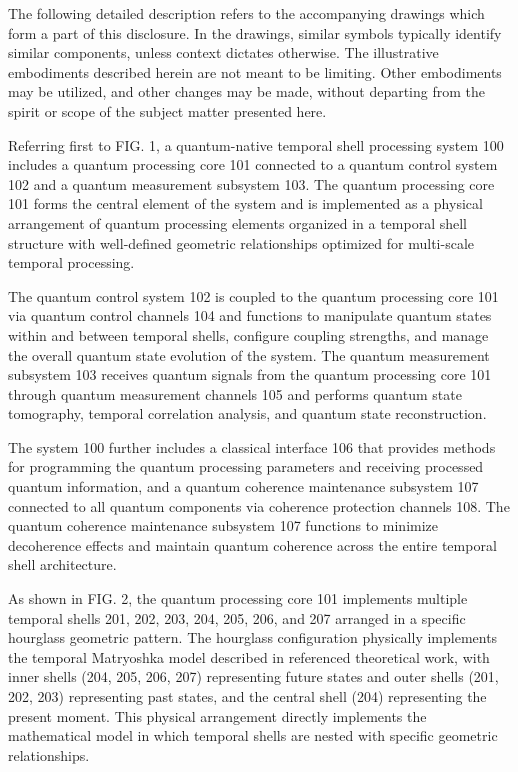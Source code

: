 \documentclass[12pt,letterpaper]{article}
\begin{document}
The following detailed description refers to the accompanying drawings which form a part of this disclosure. In the drawings, similar symbols typically identify similar components, unless context dictates otherwise. The illustrative embodiments described herein are not meant to be limiting. Other embodiments may be utilized, and other changes may be made, without departing from the spirit or scope of the subject matter presented here.

Referring first to FIG. 1, a quantum-native temporal shell processing system 100 includes a quantum processing core 101 connected to a quantum control system 102 and a quantum measurement subsystem 103. The quantum processing core 101 forms the central element of the system and is implemented as a physical arrangement of quantum processing elements organized in a temporal shell structure with well-defined geometric relationships optimized for multi-scale temporal processing.

The quantum control system 102 is coupled to the quantum processing core 101 via quantum control channels 104 and functions to manipulate quantum states within and between temporal shells, configure coupling strengths, and manage the overall quantum state evolution of the system. The quantum measurement subsystem 103 receives quantum signals from the quantum processing core 101 through quantum measurement channels 105 and performs quantum state tomography, temporal correlation analysis, and quantum state reconstruction.

The system 100 further includes a classical interface 106 that provides methods for programming the quantum processing parameters and receiving processed quantum information, and a quantum coherence maintenance subsystem 107 connected to all quantum components via coherence protection channels 108. The quantum coherence maintenance subsystem 107 functions to minimize decoherence effects and maintain quantum coherence across the entire temporal shell architecture.

As shown in FIG. 2, the quantum processing core 101 implements multiple temporal shells 201, 202, 203, 204, 205, 206, and 207 arranged in a specific hourglass geometric pattern. The hourglass configuration physically implements the temporal Matryoshka model described in referenced theoretical work, with inner shells (204, 205, 206, 207) representing future states and outer shells (201, 202, 203) representing past states, and the central shell (204) representing the present moment. This physical arrangement directly implements the mathematical model in which temporal shells are nested with specific geometric relationships.
\end{document}
